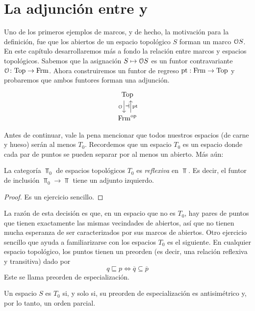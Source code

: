 \chapter{La adjunción entre  y }

Uno de los primeros ejemplos de marcos, y de hecho, la
motivación para la definición, fue que los abiertos de un espacio
topológico $S$ forman un marco $\cal OS$.
En este capítulo desarrollaremos más a fondo la relación entre marcos
y espacios topológicos. Sabemos que la asignación $S\mapsto\cal OS$ es
un funtor contravariante $\cal O\colon\Top\to\Frm$.
Ahora construiremos un funtor de regreso $\pt:\Frm\to\Top$
y probaremos que ambos funtores forman una adjunción.
\[
  \begin{tikzcd}
    \Top \ar[d,shift right=2,"\cal O"'{name=L}]
    \\
    \Frm^\op \ar[u,shift right=2,"\pt"'{name=R}]
    \adj{L}{R}
  \end{tikzcd}
\]

Antes de continuar, vale la pena mencionar que todos nuestros espacios
(de carne y hueso) ser\'an al menos $T_{0}$. Recordemos que un espacio
$T_0$ es un espacio donde cada par de puntos se pueden separar por al
menos un abierto. Más aún:
\begin{theorem}\label{tcero}
    La categoría $\Top_0$ de espacios topológicos
    $T_0$  es \emph{reflexiva} en $\Top$.
    Es decir, el funtor de inclusión $\Top_0\to\Top$
    tiene un adjunto izquierdo.
\end{theorem}
\begin{proof}
Es un ejercicio sencillo.
\end{proof}
La razón de esta decisión es que, en un espacio que no es $T_0$, hay
pares de puntos que tienen exactamente las mismas vecindades de
abiertos, así que no tienen mucha esperanza de ser caracterizados por
sus marcos de abiertos.
Otro ejercicio sencillo que ayuda a familiarizarse con los espacios
$T_0$ es el siguiente. En cualquier espacio topológico, los puntos
tienen un preorden (es decir, una relación reflexiva y transitiva)
dado por
  \[q\sqsubseteq p\iff \overline{q}\subseteq \overline{p}\]
Este se llama preorden de especialización.
\begin{exercise}
  \label{exe:especializacion}
  Un espacio $S$ es $T_0$ si, y solo si, su preorden de
  especialización es antisimétrico y, por lo tanto, un orden parcial.
\end{exercise}


